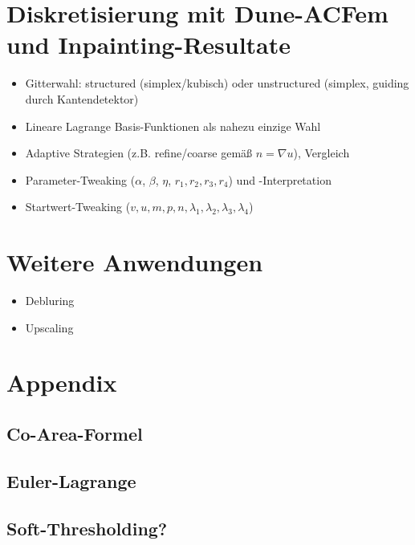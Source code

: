 \documentclass{mythesis}
\begin{document}
\section{Diskretisierung mit Dune-ACFem und Inpainting-Resultate}

\begin{itemize}
    \item
	Gitterwahl: structured (simplex/kubisch) oder unstructured (simplex, guiding durch Kantendetektor)
    \item
	Lineare Lagrange Basis-Funktionen als nahezu einzige Wahl
    \item
	Adaptive Strategien (z.B. refine/coarse gemäß $n = \nabla u$), Vergleich
    \item
	Parameter-Tweaking ($\alpha$, $\beta$, $\eta$, $r_1, r_2, r_3, r_4$) und -Interpretation
    \item
	Startwert-Tweaking ($v, u, m, p, n, \lambda_1, \lambda_2, \lambda_3, \lambda_4$)
\end{itemize}

\section{Weitere Anwendungen}

\begin{itemize}
    \item
	Debluring
    \item
	Upscaling
\end{itemize}


\section{Appendix}

\subsection{Co-Area-Formel}
\subsection{Euler-Lagrange}
\subsection{Soft-Thresholding?}
\end{document}
